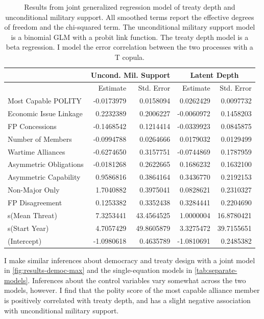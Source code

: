 \documentclass[12pt]{article}
\begin{document}
\begin{table}[ht]
\centering
\begin{tabular}{lrrrr}
  & \multicolumn{2}{c}{Uncond. Mil. Support} & \multicolumn{2}{c}{Latent Depth}\\ \hline
  & Estimate & Std. Error & Estimate & Std. Error \\ 
  \hline
  Most Capable POLITY & -0.0173979 & 0.0158094 & 0.0262429 & 0.0097732 \\ 
  Economic Issue Linkage & 0.2232389 & 0.2006227 & -0.0060972 & 0.1458203 \\ 
  FP Concessions & -0.1468542 & 0.1214414 & -0.0339923 & 0.0845875 \\ 
  Number of Members & -0.0994788 & 0.0264666 & 0.0179032 & 0.0129499 \\ 
  Wartime Alliances & -0.6274650 & 0.3157751 & -0.0744869 & 0.1787959 \\ 
  Asymmetric Obligations & -0.0181268 & 0.2622665 & 0.1686232 & 0.1632100 \\ 
  Asymmetric Capability & 0.9586816 & 0.3864164 & 0.3436770 & 0.2192153 \\ 
  Non-Major Only & 1.7040882 & 0.3975041 & 0.0828621 & 0.2310327 \\ 
  FP Disagreement & 0.1253382 & 0.3352438 & 0.3284441 & 0.2204690 \\ 
  s(Mean Threat) & 7.3253441 & 43.4564525 & 1.0000004 & 16.8780421 \\ 
  s(Start Year) & 4.7057429 & 49.8605879 & 3.3275472 & 39.7155651 \\
  (Intercept) & -1.0980618 & 0.4635789 & -1.0810691 & 0.2485382 \\  
   \hline
\end{tabular}
\caption{Results from joint generalized regression model of treaty depth and unconditional military support. 
                     All smoothed terms report the effective degrees of freedom and the chi-squared term. 
                     The unconditional military support model is a binomial GLM with a probit link function. 
                     The treaty depth model is a beta regression. 
                     I model the error correlation between the two processes with a T copula.} 
\label{tab:gjrm-res}
\end{table} 


I make similar inferences about democracy and treaty design with a joint model in \autoref{fig:results-democ-max} and the single-equation models in \autoref{tab:separate-models}.
Inferences about the control variables vary somewhat across the two models, however. 
I find that the polity score of the most capable alliance member is positively correlated with treaty depth, and has a slight negative association with unconditional military support.
\end{document}
